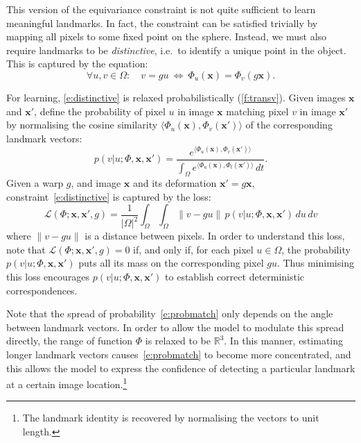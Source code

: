 \documentclass[10pt,twocolumn,letterpaper]{article}
\makeatletter
\newcommand{\bx}{\mathbf{x}}
\renewcommand{\paragraph}{\@startsection{paragraph}{4}{\z@}{0.5em}{-1em}{\normalfont\normalsize\bfseries}}
\makeatother
\begin{document}
This version of the equivariance constraint is not quite sufficient to learn meaningful landmarks.
In fact, the constraint can be satisfied trivially by mapping all pixels to some fixed point on the sphere.
Instead, we must also require landmarks to be \emph{distinctive}, i.e.~to identify a unique point in the object.
This is captured by the equation:
\begin{equation}\label{e:distinctive}
   \forall u, v\in \Omega: \quad v=gu ~\Leftrightarrow~ \Phi_{u}(\bx) = \Phi_{v}(g\bx).
\end{equation}

\paragraph{Probabilistic formulation.}

For learning, \cref{e:distinctive} is relaxed probabilistically (\cref{f:transv}). Given images $\bx$ and $\bx'$, define the probability of pixel $u$ in image $\bx$ matching pixel $v$ in image $\bx'$ by normalising the cosine similarity $\langle\Phi_u(\bx),\Phi_v(\bx')\rangle$ of the corresponding landmark vectors:
\begin{equation}\label{e:probmatch}
p(v|u;\Phi,\bx,\bx') =
\frac
{e^{\langle \Phi_u(\bx),\Phi_v(\bx') \rangle}}
{\int_\Omega e^{\langle \Phi_u(\bx),\Phi_{t}(\bx') \rangle}\,dt}.
\end{equation}
Given a warp $g$, and image $\bx$ and its deformation $\bx' = g\bx$, constraint~\cref{e:distinctive} is captured by the loss:
\begin{equation}\label{e:loss1}
\mathcal{L}(\Phi;\bx,\bx',g)
=
\frac{1}{|\Omega|^{2}}
\int_\Omega \int_\Omega \|v - gu\|\, p(v|u;\Phi,\bx,\bx') \,du\,dv
\end{equation}
where $\|v - gu\|$ is a distance between pixels.
In order to understand this loss, note that $\mathcal{L}(\Phi;\bx,\bx',g)=0$ if, and only if, for each pixel $u\in\Omega$, the probability $p(v|u;\Phi,\bx,\bx')$ puts all its mass on the corresponding pixel $gu$.
Thus minimising this loss encourages $p(v|u;\Phi,\bx,\bx')$ to establish correct deterministic correspondences.

Note that the spread of probability~\eqref{e:probmatch} only depends on the angle between landmark vectors.
In order to allow the model to modulate this spread directly, the range of function $\Phi$ is relaxed to be $\mathbb{R}^3$.
In this manner, estimating longer landmark vectors causes~\eqref{e:probmatch} to become more concentrated, and this allows the model to express the confidence of detecting a particular landmark at a certain image location.\footnote{The landmark identity is recovered by normalising the vectors to unit length.}
\end{document}

